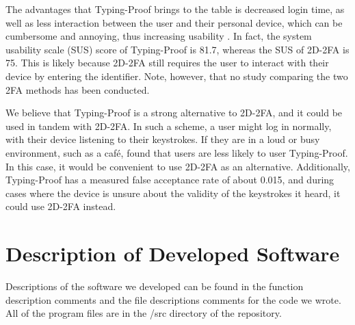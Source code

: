\documentclass[11pt]{article}
\begin{document}
The advantages that Typing-Proof brings to the table is decreased login
time, as well as less interaction between the user and their personal
device, which can be cumbersome and annoying, thus increasing usability
\cite{liuTypingProof}. In fact, the system usability scale (SUS) score
of Typing-Proof is 81.7, whereas the SUS of 2D-2FA is 75. This is likely
because 2D-2FA still requires the user to interact with their device by
entering the identifier. Note, however, that no study comparing the two
2FA methods has been conducted.  

We believe that Typing-Proof is a strong alternative to 2D-2FA, and it
could be used in tandem with 2D-2FA. In such a scheme, a user might
log in normally, with their device listening to their keystrokes. If
they are in a loud or busy environment, such as a caf\'e,
\cite{liuTypingProof} found that users are less likely to user
Typing-Proof. In this case, it would be convenient to use 2D-2FA as an
alternative. Additionally, Typing-Proof has a measured false acceptance
rate of about 0.015, and during cases where the device is unsure about
the validity of the keystrokes it heard, it could use 2D-2FA instead.





\appendix
\section{Description of Developed Software}

Descriptions of the software we developed can be found in the function
description comments and the file descriptions comments for the code we
wrote. All of the program files are in the /src directory of the
repository. 
\end{document}
